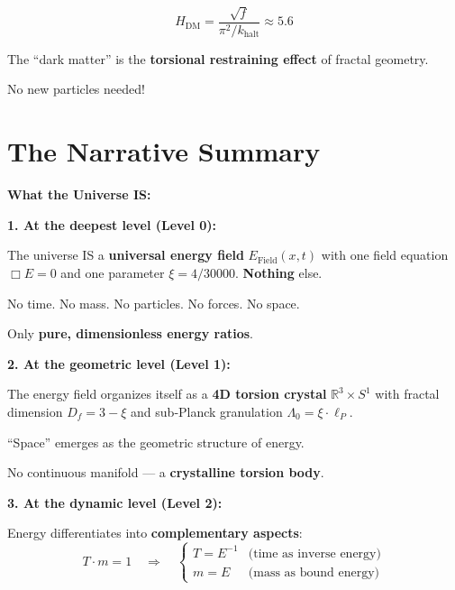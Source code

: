 	\begin{equation}
		H_{\text{DM}} = \frac{\sqrt{f}}{\pi^2/k_{\text{halt}}} \approx 5.6
	\end{equation}

	The \enquote{dark matter} is the \textbf{torsional restraining effect} of fractal geometry.

	No new particles needed!

	\section{The Narrative Summary}

	\begin{revolutionary}[The Complete Story]

		\textbf{What the Universe IS:}
		\normalsize

		\vspace{0.5cm}

		\textbf{1. At the deepest level (Level 0):}

		The universe IS a \textbf{universal energy field} $E_{\text{Field}}(x,t)$ with one field equation $\Box E = 0$ and one parameter $\xi = 4/30000$. \textbf{Nothing} else.

		\vspace{0.3cm}

		No time. No mass. No particles. No forces. No space.

		Only \textbf{pure, dimensionless energy ratios}.

		\vspace{0.5cm}

		\textbf{2. At the geometric level (Level 1):}

		The energy field organizes itself as a \textbf{4D torsion crystal} $\mathbb{R}^3 \times S^1$ with fractal dimension $D_f = 3-\xi$ and sub‑Planck granulation $\Lambda_0 = \xi \cdot \ell_P$.

		\vspace{0.3cm}

		\enquote{Space} emerges as the geometric structure of energy.

		No continuous manifold — a \textbf{crystalline torsion body}.

		\vspace{0.5cm}

		\textbf{3. At the dynamic level (Level 2):}

		Energy differentiates into \textbf{complementary aspects}:
		\begin{equation}
			T \cdot m = 1 \quad \Rightarrow \quad \begin{cases}
				T = E^{-1} & \text{(time as inverse energy)} \\
				m = E & \text{(mass as bound energy)}
			\end{cases}
		\end{equation}


\end{revolutionary}
